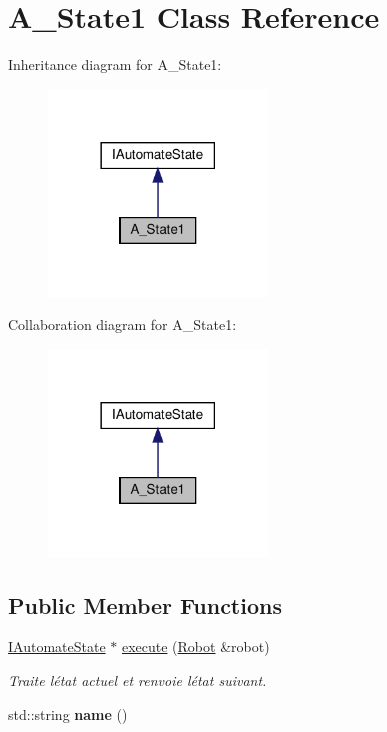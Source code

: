 \hypertarget{classA__State1}{}\section{A\+\_\+\+State1 Class Reference}
\label{classA__State1}


Inheritance diagram for A\+\_\+\+State1\+:
\nopagebreak
\begin{figure}[H]
\begin{center}
\leavevmode
\includegraphics[width=165pt]{classA__State1__inherit__graph}
\end{center}
\end{figure}


Collaboration diagram for A\+\_\+\+State1\+:
\nopagebreak
\begin{figure}[H]
\begin{center}
\leavevmode
\includegraphics[width=165pt]{classA__State1__coll__graph}
\end{center}
\end{figure}
\subsection*{Public Member Functions}
\begin{DoxyCompactItemize}
\item 
\hyperlink{classIAutomateState}{I\+Automate\+State} $\ast$ \hyperlink{classA__State1_a351a7c94100ccc0dfb8a09e2037d4cc2}{execute} (\hyperlink{classRobot}{Robot} \&robot)
\begin{DoxyCompactList}\small\item\em Traite l\textquotesingle{}état actuel et renvoie l\textquotesingle{}état suivant. \end{DoxyCompactList}\item 
\mbox{\label{classA__State1_ac418559b2a983872a2010f5463ca6f3c}} 
std\+::string {\bfseries name} ()
\end{DoxyCompactItemize}

